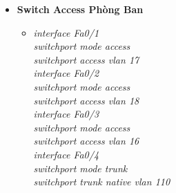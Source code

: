 \documentclass[12pt,a4paper]{report}
\begin{document}
\begin{itemize}
\begin{itemize}
\begin{itemize}
    \end{itemize}
     \item \textbf{Switch Access Phòng Ban}
     \begin{itemize}
      \item \textit{interface Fa0/1\\
switchport mode access\\
switchport access vlan 17\\
interface Fa0/2\\
switchport mode access\\
switchport access vlan 18\\
interface Fa0/3\\
switchport mode access\\
switchport access vlan 16\\
interface Fa0/4\\
switchport mode trunk\\
switchport trunk native vlan 110\\}
     
    \end{itemize}
   \end{itemize}
\end{itemize}
\end{document}
